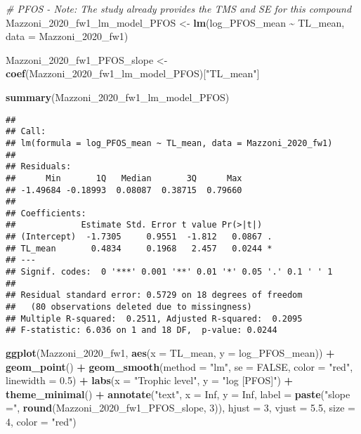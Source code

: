 \documentclass[
]{article}
\newenvironment{Shaded}{\begin{snugshade}}{\end{snugshade}}
\newcommand{\AttributeTok}[1]{\textcolor[rgb]{0.13,0.29,0.53}{#1}}
\newcommand{\CommentTok}[1]{\textcolor[rgb]{0.56,0.35,0.01}{\textit{#1}}}
\newcommand{\ConstantTok}[1]{\textcolor[rgb]{0.56,0.35,0.01}{#1}}
\newcommand{\DecValTok}[1]{\textcolor[rgb]{0.00,0.00,0.81}{#1}}
\newcommand{\FloatTok}[1]{\textcolor[rgb]{0.00,0.00,0.81}{#1}}
\newcommand{\FunctionTok}[1]{\textcolor[rgb]{0.13,0.29,0.53}{\textbf{#1}}}
\newcommand{\NormalTok}[1]{#1}
\newcommand{\OtherTok}[1]{\textcolor[rgb]{0.56,0.35,0.01}{#1}}
\newcommand{\SpecialCharTok}[1]{\textcolor[rgb]{0.81,0.36,0.00}{\textbf{#1}}}
\newcommand{\StringTok}[1]{\textcolor[rgb]{0.31,0.60,0.02}{#1}}
\begin{document}
\begin{Shaded}
\begin{Highlighting}[]
\CommentTok{\# PFOS {-} Note: The study already provides the TMS and SE for this compound}
\NormalTok{Mazzoni\_2020\_fw1\_lm\_model\_PFOS }\OtherTok{\textless{}{-}} \FunctionTok{lm}\NormalTok{(log\_PFOS\_mean }\SpecialCharTok{\textasciitilde{}}\NormalTok{ TL\_mean, }\AttributeTok{data =}\NormalTok{ Mazzoni\_2020\_fw1)}

\NormalTok{Mazzoni\_2020\_fw1\_PFOS\_slope }\OtherTok{\textless{}{-}} \FunctionTok{coef}\NormalTok{(Mazzoni\_2020\_fw1\_lm\_model\_PFOS)[}\StringTok{"TL\_mean"}\NormalTok{]}

\FunctionTok{summary}\NormalTok{(Mazzoni\_2020\_fw1\_lm\_model\_PFOS)}
\end{Highlighting}
\end{Shaded}

\begin{verbatim}
## 
## Call:
## lm(formula = log_PFOS_mean ~ TL_mean, data = Mazzoni_2020_fw1)
## 
## Residuals:
##      Min       1Q   Median       3Q      Max 
## -1.49684 -0.18993  0.08087  0.38715  0.79660 
## 
## Coefficients:
##             Estimate Std. Error t value Pr(>|t|)  
## (Intercept)  -1.7305     0.9551  -1.812   0.0867 .
## TL_mean       0.4834     0.1968   2.457   0.0244 *
## ---
## Signif. codes:  0 '***' 0.001 '**' 0.01 '*' 0.05 '.' 0.1 ' ' 1
## 
## Residual standard error: 0.5729 on 18 degrees of freedom
##   (80 observations deleted due to missingness)
## Multiple R-squared:  0.2511, Adjusted R-squared:  0.2095 
## F-statistic: 6.036 on 1 and 18 DF,  p-value: 0.0244
\end{verbatim}

\begin{Shaded}
\begin{Highlighting}[]
\FunctionTok{ggplot}\NormalTok{(Mazzoni\_2020\_fw1, }\FunctionTok{aes}\NormalTok{(}\AttributeTok{x =}\NormalTok{ TL\_mean, }\AttributeTok{y =}\NormalTok{ log\_PFOS\_mean)) }\SpecialCharTok{+}
  \FunctionTok{geom\_point}\NormalTok{() }\SpecialCharTok{+}
  \FunctionTok{geom\_smooth}\NormalTok{(}\AttributeTok{method =} \StringTok{"lm"}\NormalTok{, }\AttributeTok{se =} \ConstantTok{FALSE}\NormalTok{, }\AttributeTok{color =} \StringTok{"red"}\NormalTok{, }\AttributeTok{linewidth =} \FloatTok{0.5}\NormalTok{) }\SpecialCharTok{+}
  \FunctionTok{labs}\NormalTok{(}\AttributeTok{x =} \StringTok{"Trophic level"}\NormalTok{,}
       \AttributeTok{y =} \StringTok{"log [PFOS]"}\NormalTok{) }\SpecialCharTok{+}
  \FunctionTok{theme\_minimal}\NormalTok{() }\SpecialCharTok{+}
  \FunctionTok{annotate}\NormalTok{(}\StringTok{"text"}\NormalTok{, }\AttributeTok{x =} \ConstantTok{Inf}\NormalTok{, }\AttributeTok{y =} \ConstantTok{Inf}\NormalTok{, }\AttributeTok{label =} \FunctionTok{paste}\NormalTok{(}\StringTok{"slope ="}\NormalTok{, }\FunctionTok{round}\NormalTok{(Mazzoni\_2020\_fw1\_PFOS\_slope, }\DecValTok{3}\NormalTok{)), }
           \AttributeTok{hjust =} \DecValTok{3}\NormalTok{, }\AttributeTok{vjust =} \FloatTok{5.5}\NormalTok{, }\AttributeTok{size =} \DecValTok{4}\NormalTok{, }\AttributeTok{color =} \StringTok{"red"}\NormalTok{)}
\end{Highlighting}
\end{Shaded}
\end{document}
